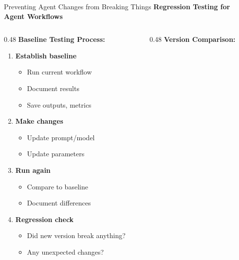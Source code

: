 \documentclass[aspectratio=169,11pt]{beamer}
\begin{document}
\begin{frame}[fragile]{Preventing Agent Changes from Breaking Things}
    \textbf{Regression Testing for Agent Workflows}

    \begin{columns}[T]
        \begin{column}{0.48\textwidth}
            \textbf{Baseline Testing Process:}
            \begin{enumerate}
                \item \textbf{Establish baseline}
                \begin{itemize}
                    \item Run current workflow
                    \item Document results
                    \item Save outputs, metrics
                \end{itemize}

                \item \textbf{Make changes}
                \begin{itemize}
                    \item Update prompt/model
                    \item Update parameters
                \end{itemize}

                \item \textbf{Run again}
                \begin{itemize}
                    \item Compare to baseline
                    \item Document differences
                \end{itemize}

                \item \textbf{Regression check}
                \begin{itemize}
                    \item Did new version break anything?
                    \item Any unexpected changes?
                \end{itemize}
            \end{enumerate}
        \end{column}
        \begin{column}{0.48\textwidth}
            \textbf{Version Comparison:}


\end{column}
\end{columns}
\end{frame}
\end{document}
